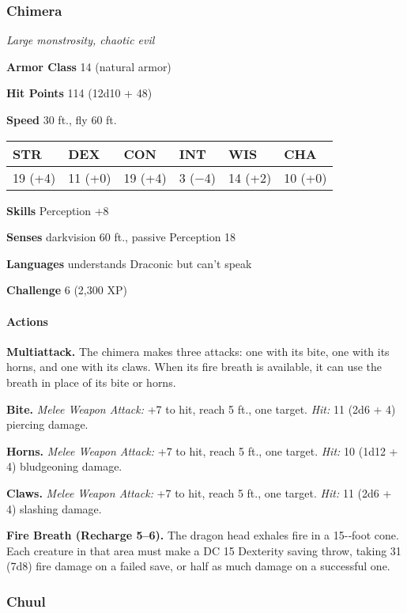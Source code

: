 \documentclass[
]{article}
\begin{document}
\hypertarget{chimera}{%
\subsubsection{Chimera}\label{chimera}}

\emph{Large monstrosity, chaotic evil}

\textbf{Armor Class} 14 (natural armor)

\textbf{Hit Points} 114 (12d10 + 48)

\textbf{Speed} 30 ft., fly 60 ft.

\begin{longtable}[]{@{}llllll@{}}
\toprule
STR & DEX & CON & INT & WIS & CHA\tabularnewline
\midrule
\endhead
19 (+4) & 11 (+0) & 19 (+4) & 3 (−4) & 14 (+2) & 10 (+0)\tabularnewline
\bottomrule
\end{longtable}

\textbf{Skills} Perception +8

\textbf{Senses} darkvision 60 ft., passive Perception 18

\textbf{Languages} understands Draconic but can't speak

\textbf{Challenge} 6 (2,300 XP)

\hypertarget{actions-1}{%
\paragraph{Actions}\label{actions-1}}

\textbf{Multiattack.} The chimera makes three attacks: one with its
bite, one with its horns, and one with its claws. When its fire breath
is available, it can use the breath in place of its bite or horns.

\textbf{Bite.} \emph{Melee Weapon Attack:} +7 to hit, reach 5 ft., one
target. \emph{Hit:} 11 (2d6 + 4) piercing damage.

\textbf{Horns.} \emph{Melee Weapon Attack:} +7 to hit, reach 5 ft., one
target. \emph{Hit:} 10 (1d12 + 4) bludgeoning damage.

\textbf{Claws.} \emph{Melee Weapon Attack:} +7 to hit, reach 5 ft., one
target. \emph{Hit:} 11 (2d6 + 4) slashing damage.

\textbf{Fire Breath (Recharge 5--6).} The dragon head exhales fire in a
15-­‐foot cone. Each creature in that area must make a DC 15 Dexterity
saving throw, taking 31 (7d8) fire damage on a failed save, or half as
much damage on a successful one.

\hypertarget{chuul}{%
\subsubsection{Chuul}\label{chuul}}
\end{document}
